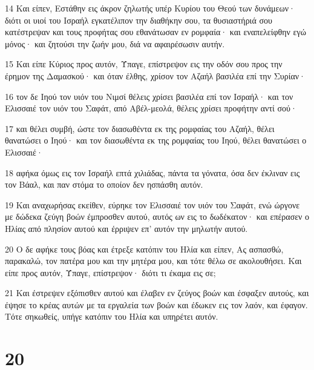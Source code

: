 \par 14 Και είπεν, Εστάθην εις άκρον ζηλωτής υπέρ Κυρίου του Θεού των δυνάμεων· διότι οι υιοί του Ισραήλ εγκατέλιπον την διαθήκην σου, τα θυσιαστήριά σου κατέστρεψαν και τους προφήτας σου εθανάτωσαν εν ρομφαία· και εναπελείφθην εγώ μόνος· και ζητούσι την ζωήν μου, διά να αφαιρέσωσιν αυτήν.
\par 15 Και είπε Κύριος προς αυτόν, Ύπαγε, επίστρεψον εις την οδόν σου προς την έρημον της Δαμασκού· και όταν έλθης, χρίσον τον Αζαήλ βασιλέα επί την Συρίαν·
\par 16 τον δε Ιηού τον υιόν του Νιμσί θέλεις χρίσει βασιλέα επί τον Ισραήλ· και τον Ελισσαιέ τον υιόν του Σαφάτ, από Αβέλ-μεολά, θέλεις χρίσει προφήτην αντί σού·
\par 17 και θέλει συμβή, ώστε τον διασωθέντα εκ της ρομφαίας του Αζαήλ, θέλει θανατώσει ο Ιηού· και τον διασωθέντα εκ της ρομφαίας του Ιηού, θέλει θανατώσει ο Ελισσαιέ·
\par 18 αφήκα όμως εις τον Ισραήλ επτά χιλιάδας, πάντα τα γόνατα, όσα δεν έκλιναν εις τον Βάαλ, και παν στόμα το οποίον δεν ησπάσθη αυτόν.
\par 19 Και αναχωρήσας εκείθεν, εύρηκε τον Ελισσαιέ τον υιόν του Σαφάτ, ενώ ώργονε με δώδεκα ζεύγη βοών έμπροσθεν αυτού, αυτός ων εις το δωδέκατον· και επέρασεν ο Ηλίας από πλησίον αυτού και έρριψεν επ' αυτόν την μηλωτήν αυτού.
\par 20 Ο δε αφήκε τους βόας και έτρεξε κατόπιν του Ηλία και είπεν, Ας ασπασθώ, παρακαλώ, τον πατέρα μου και την μητέρα μου, και τότε θέλω σε ακολουθήσει. Και είπε προς αυτόν, Ύπαγε, επίστρεψον· διότι τι έκαμα εις σε;
\par 21 Και έστρεψεν εξόπισθεν αυτού και έλαβεν εν ζεύγος βοών και έσφαξεν αυτούς, και έψησε το κρέας αυτών με τα εργαλεία των βοών και έδωκεν εις τον λαόν, και έφαγον. Τότε σηκωθείς, υπήγε κατόπιν του Ηλία και υπηρέτει αυτόν.

\chapter{20}

